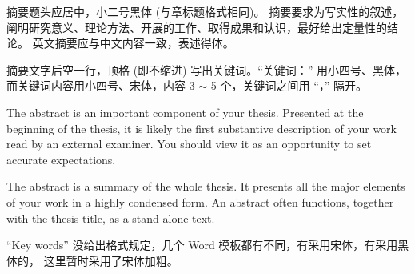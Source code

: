 \begin{cabstract}
    摘要题头应居中，小二号黑体 (与章标题格式相同)。
    摘要要求为写实性的叙述，阐明研究意义、理论方法、开展的工作、取得成果和认识，最好给出定量性的结论。
    英文摘要应与中文内容一致，表述得体。

    摘要文字后空一行，顶格 (即不缩进) 写出关键词。``关键词：'' 用小四号、黑体，
    而关键词内容用小四号、宋体，内容 3 $\sim$ 5 个，关键词之间用  ``，'' 隔开。
\end{cabstract}

\begin{eabstract}
    The abstract is an important component of your thesis. Presented at the 
    beginning of the thesis, it is likely the first substantive description of 
    your work read by an external examiner. You should view it as an opportunity 
    to set accurate expectations.

    The abstract is a summary of the whole thesis. It presents all the major 
    elements of your work in a highly condensed form.
    An abstract often functions, together with the thesis title,
    as a stand-alone text.

    ``Key words'' 没给出格式规定，几个 Word 模板都有不同，有采用宋体，有采用黑体的，
    这里暂时采用了宋体加粗。
\end{eabstract}
